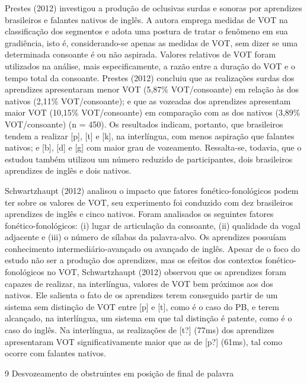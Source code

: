 Prestes (2012) investigou a produ\c{c}\~ao de oclusivas surdas e sonoras por
aprendizes brasileiros e falantes nativos de ingl\^es. A autora emprega
medidas de VOT na classifica\c{c}\~ao dos segmentos e adota uma postura de
tratar o fen\^omeno em sua gradi\^encia, isto \'e, considerando-se apenas as
medidas de VOT, sem dizer se uma determinada consoante \'e ou n\~ao
aspirada. Valores relativos de VOT foram utilizados na an\'alise, mais
especificamente, a raz\~ao entre a dura\c{c}\~ao do VOT e o tempo total da
consoante. Prestes (2012) concluiu que as realiza\c{c}\~oes surdas dos
aprendizes apresentaram menor VOT (5,87\% VOT/consoante) em rela\c{c}\~ao às
dos nativos (2,11\% VOT/consoante); e que as vozeadas dos aprendizes
apresentam maior VOT (10,15\% VOT/consoante) em compara\c{c}\~ao com as dos
nativos (3,89\% VOT/consoante) (n = 450). Os resultados indicam,
portanto, que brasileiros tendem a realizar {[}p{]}, {[}t{]} e {[}k{]},
na interl\'ingua, com menos aspira\c{c}\~ao que falantes nativos; e {[}b{]},
{[}d{]} e {[}g{]} com maior grau de vozeamento. Ressalta-se, todavia,
que o estudou tamb\'em utilizou um n\'umero reduzido de participantes, dois
brasileiros aprendizes de ingl\^es e dois nativos.

Schwartzhaupt (2012) analisou o impacto que fatores fon\'etico-fonol\'ogicos
podem ter sobre os valores de VOT, seu experimento foi conduzido com dez
brasileiros aprendizes de ingl\^es e cinco nativos. Foram analisados os
seguintes fatores fon\'etico-fonol\'ogicos: (i) lugar de articula\c{c}\~ao da
consoante, (ii) qualidade da vogal adjacente e (iii) o n\'umero de s\'ilabas
da palavra-alvo. Os aprendizes possu\'iam conhecimento
intermedi\'ario-avan\c{c}ado ou avan\c{c}ado de ingl\^es. Apesar de o foco do estudo
n\~ao ser a produ\c{c}\~ao dos aprendizes, mas os efeitos dos contextos
fon\'etico-fonol\'ogicos no VOT, Schwartzhaupt (2012) observou que os
aprendizes foram capazes de realizar, na interl\'ingua, valores de VOT bem
pr\'oximos aos dos nativos. Ele salienta o fato de os aprendizes terem
conseguido partir de um sistema sem distin\c{c}\~ao de VOT entre {[}p{]} e
{[}t{]}, como \'e o caso do PB, e terem alcan\c{c}ado, na interl\'ingua, um
sistema em que tal distin\c{c}\~ao \'e patente, como \'e o caso do ingl\^es. Na
interl\'ingua, as realiza\c{c}\~oes de {[}t?{]} (77ms) dos aprendizes
apresentaram VOT significativamente maior que as de {[}p?{]} (61ms), tal
como ocorre com falantes nativos.

9 Desvozeamento de obstruintes em posi\c{c}\~ao de final de palavra

